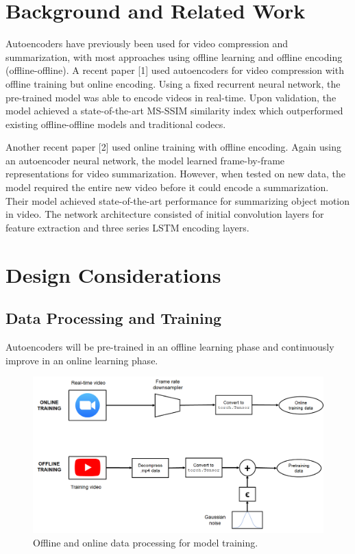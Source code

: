 \documentclass[letter, 12pt]{article}
\begin{document}
\clearpage
\section{Background and Related Work}

Autoencoders have previously been used for video compression and summarization, with most approaches using offline learning and offline encoding (offline-offline). A recent paper [1] used autoencoders for video compression with offline training but online encoding. Using a fixed recurrent neural network, the pre-trained model was able to encode videos in real-time. Upon validation, the model achieved a state-of-the-art MS-SSIM similarity index which outperformed existing offline-offline models and traditional codecs. 

Another recent paper [2] used online training with offline encoding. Again using an autoencoder neural network, the model learned frame-by-frame representations for video summarization. However, when tested on new data, the model required the entire new video before it could encode a summarization. Their model achieved state-of-the-art performance for summarizing object motion in video. The network architecture consisted of initial convolution layers for feature extraction and three series LSTM encoding layers.

\section{Design Considerations}

\subsection{Data Processing and Training}

Autoencoders will be pre-trained in an offline learning phase and continuously improve in an online learning phase.

\begin{figure}[h] %
\centering
\includegraphics[width=16cm]{data_pipeline.png}
\caption{Offline and online data processing for model training.}
\label{fig:data}
\end{figure}
\end{document}
